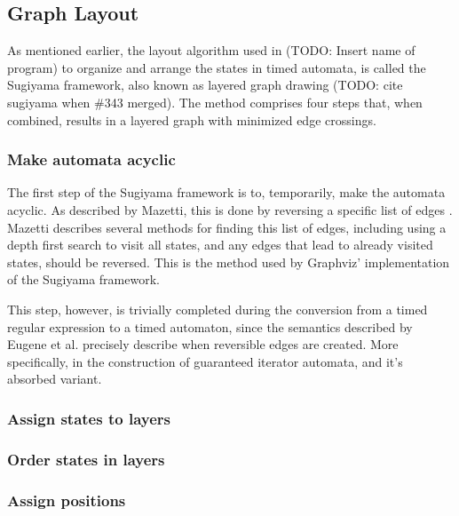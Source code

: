 \subsection{Graph Layout}


As mentioned earlier, the layout algorithm used in (TODO: Insert name of program) to organize and arrange the states in timed automata, is called the Sugiyama framework, also known as layered graph drawing (TODO: cite sugiyama when \#343 merged). The method comprises four steps that, when combined, results in a layered graph with minimized edge crossings.


\subsubsection{Make automata acyclic}
The first step of the Sugiyama framework is to, temporarily, make the automata acyclic. As described by Mazetti, this is done by reversing a specific list of edges \cite{Mazetti2012}.
Mazetti describes several methods for finding this list of edges, including using a depth first search to visit all states, and any edges that lead to already visited states, should be reversed.
This is the method used by Graphviz' implementation of the Sugiyama framework. %

This step, however, is trivially completed during the conversion from a timed regular expression to a timed automaton, since the semantics described by Eugene et al. precisely describe when reversible edges are created.
More specifically, in the construction of guaranteed iterator automata, and it's absorbed variant\cite{Eugene2001}.



\subsubsection{Assign states to layers}
\subsubsection{Order states in layers}
\subsubsection{Assign positions}